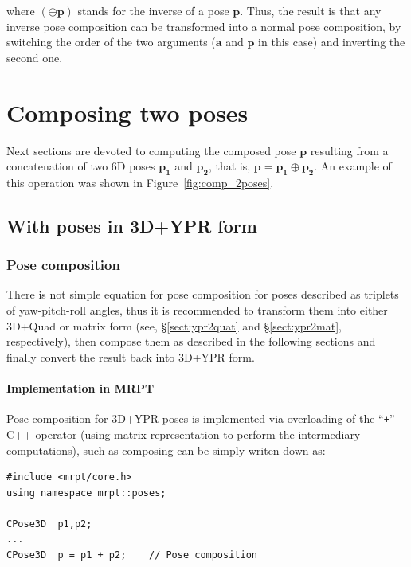 \documentclass[a4paper,10pt]{report}
\begin{document}
\noindent where $(\ominus \mathbf{p})$ stands for the inverse of a pose $\mathbf{p}$. 
Thus, the result is that any inverse pose composition can be transformed into a normal 
pose composition, by switching the order of the two arguments
($\mathbf{a}$ and $\mathbf{p}$ in this case) and inverting the second one.


\chapter{Composing two poses}

Next sections are devoted to computing the composed pose $\mathbf{p}$ resulting
from a concatenation of two 6D poses $\mathbf{p_1}$ and $\mathbf{p_2}$, 
that is, $\mathbf{p} = \mathbf{p_1} \oplus \mathbf{p_2}$. 
An example of this operation was shown in Figure~\ref{fig:comp_2poses}.

\section{With poses in 3D+YPR form}

\subsection{Pose composition}

There is not simple
equation for pose composition for poses described as triplets 
of yaw-pitch-roll angles, thus it is recommended to transform them into 
either 3D+Quad or matrix form 
(see, \S \ref{sect:ypr2quat} and \S \ref{sect:ypr2mat}, respectively), 
then compose them as described in the following sections and finally
convert the result back into 3D+YPR form.

\subsubsection{Implementation in MRPT}

Pose composition for 3D+YPR poses is implemented via overloading 
of the ``\texttt{+}'' C++ operator 
(using matrix representation to perform the intermediary computations), 
such as composing can be simply 
writen down as:

\begin{lstlisting}
#include <mrpt/core.h> 
using namespace mrpt::poses; 

CPose3D  p1,p2; 
...
CPose3D  p = p1 + p2;    // Pose composition
\end{lstlisting}
\end{document}
